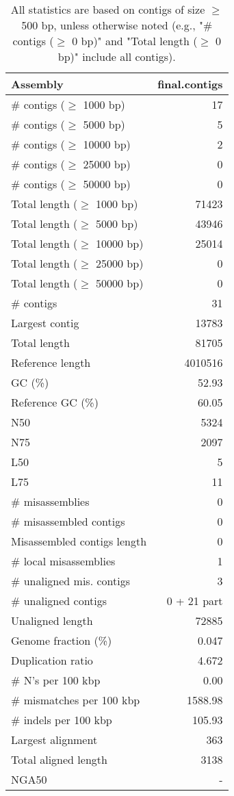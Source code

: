 \documentclass[12pt,a4paper]{article}
\begin{document}
\begin{table}[ht]
\begin{center}
\caption{All statistics are based on contigs of size $\geq$ 500 bp, unless otherwise noted (e.g., "\# contigs ($\geq$ 0 bp)" and "Total length ($\geq$ 0 bp)" include all contigs).}
\begin{tabular}{|l*{1}{|r}|}
\hline
Assembly & final.contigs \\ \hline
\# contigs ($\geq$ 1000 bp) & 17 \\ \hline
\# contigs ($\geq$ 5000 bp) & 5 \\ \hline
\# contigs ($\geq$ 10000 bp) & 2 \\ \hline
\# contigs ($\geq$ 25000 bp) & 0 \\ \hline
\# contigs ($\geq$ 50000 bp) & 0 \\ \hline
Total length ($\geq$ 1000 bp) & 71423 \\ \hline
Total length ($\geq$ 5000 bp) & 43946 \\ \hline
Total length ($\geq$ 10000 bp) & 25014 \\ \hline
Total length ($\geq$ 25000 bp) & 0 \\ \hline
Total length ($\geq$ 50000 bp) & 0 \\ \hline
\# contigs & 31 \\ \hline
Largest contig & 13783 \\ \hline
Total length & 81705 \\ \hline
Reference length & 4010516 \\ \hline
GC (\%) & 52.93 \\ \hline
Reference GC (\%) & 60.05 \\ \hline
N50 & 5324 \\ \hline
N75 & 2097 \\ \hline
L50 & 5 \\ \hline
L75 & 11 \\ \hline
\# misassemblies & 0 \\ \hline
\# misassembled contigs & 0 \\ \hline
Misassembled contigs length & 0 \\ \hline
\# local misassemblies & 1 \\ \hline
\# unaligned mis. contigs & 3 \\ \hline
\# unaligned contigs & 0 + 21 part \\ \hline
Unaligned length & 72885 \\ \hline
Genome fraction (\%) & 0.047 \\ \hline
Duplication ratio & 4.672 \\ \hline
\# N's per 100 kbp & 0.00 \\ \hline
\# mismatches per 100 kbp & 1588.98 \\ \hline
\# indels per 100 kbp & 105.93 \\ \hline
Largest alignment & 363 \\ \hline
Total aligned length & 3138 \\ \hline
NGA50 & - \\ \hline
\end{tabular}
\end{center}
\end{table}
\end{document}
